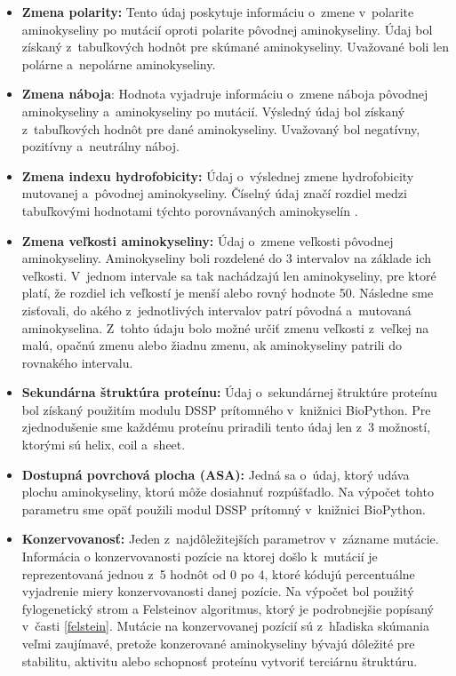 \begin{itemize}
	\item \textbf{Zmena polarity:} Tento údaj poskytuje informáciu o~zmene v~polarite aminokyseliny po mutácií oproti polarite pôvodnej aminokyseliny. Údaj bol získaný z~tabuľkových hodnôt pre skúmané aminokyseliny. Uvažované boli len polárne a~nepolárne aminokyseliny.
	\item \textbf{Zmena náboja}: Hodnota vyjadruje informáciu o~zmene náboja pôvodnej aminokyseliny a~aminokyseliny po mutácií. Výsledný údaj bol získaný z~tabuľkových hodnôt pre dané aminokyseliny. Uvažovaný bol negatívny, pozitívny a~neutrálny náboj. 
	\item \textbf{Zmena indexu hydrofobicity:} Údaj o~výslednej zmene hydrofobicity mutovanej a~pôvodnej aminokyseliny. Číselný údaj značí rozdiel medzi tabuľkovými hodnotami týchto porovnávaných aminokyselín \cite{hydrophobicity}. 
	\item \textbf{Zmena veľkosti aminokyseliny:} Údaj o~zmene veľkosti pôvodnej aminokyseliny. Aminokyseliny boli rozdelené do 3 intervalov na základe ich veľkosti. V~jednom intervale sa tak nachádzajú len aminokyseliny, pre ktoré platí, že rozdiel ich veľkostí je menší alebo rovný hodnote 50. Následne sme zisťovali, do akého z~jednotlivých intervalov patrí pôvodná a~mutovaná aminokyselina. Z~tohto údaju bolo možné určiť zmenu veľkosti z~veľkej na malú, opačnú zmenu alebo žiadnu zmenu, ak aminokyseliny patrili do rovnakého intervalu.
	\item \textbf{Sekundárna štruktúra proteínu:} Údaj o~sekundárnej štruktúre proteínu bol získaný použitím modulu DSSP prítomného v knižnici BioPython. Pre zjednodušenie sme každému proteínu priradili tento údaj len z~3 možností, ktorými sú helix, coil a sheet.
	\item \textbf{Dostupná povrchová plocha (ASA):} Jedná sa o~údaj, ktorý udáva plochu aminokyseliny, ktorú môže dosiahnuť rozpúšťadlo. Na výpočet tohto parametru sme opäť použili modul DSSP prítomný v~knižnici BioPython.
	\item \textbf{Konzervovanosť:} Jeden z~najdôležitejších parametrov v~zázname mutácie. Informácia o konzervovanosti pozície na ktorej došlo k~mutácií je reprezentovaná
	jednou z~5 hodnôt od 0 po 4, ktoré kódujú percentuálne vyjadrenie miery konzervovanosti danej pozície. Na výpočet bol použitý fylogenetický strom a Felsteinov algoritmus, ktorý je podrobnejšie popísaný v~časti \ref{felstein}. Mutácie na konzervovanej pozícií sú z~hľadiska skúmania veľmi zaujímavé, pretože konzerované aminokyseliny bývajú dôležité pre stabilitu, aktivitu alebo schopnosť proteínu vytvoriť terciárnu štruktúru.

\end{itemize}
